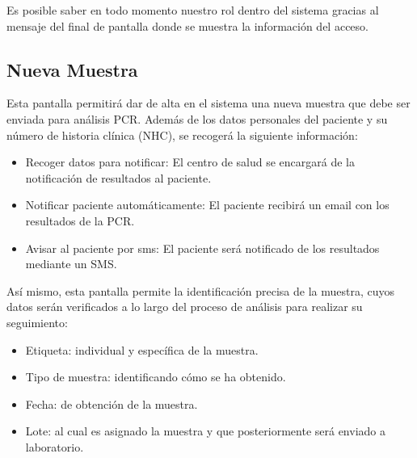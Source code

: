 \documentclass[a4paper,spanish]{paper}
\begin{document}
\medskip
\begin{tcolorbox}[colback=blue!3!white,colframe=blue(ryb)!50!black,title=\textbf{Tip}]

Es posible saber en todo momento nuestro rol dentro del sistema gracias al mensaje del final de pantalla donde se muestra la información del acceso.

\end{tcolorbox}

\subsection{Nueva Muestra}

Esta pantalla permitirá dar de alta en el sistema una nueva muestra que debe ser enviada para análisis PCR. Además de los datos personales del paciente y su número de historia clínica (NHC), se recogerá la siguiente información:

\begin{itemize}
    \item Recoger datos para notificar: El centro de salud se encargará de la notificación de resultados al paciente.
    \item Notificar paciente automáticamente: El paciente recibirá un email con los resultados de la PCR.
    \item Avisar al paciente por sms: El paciente será notificado de los resultados mediante un SMS.
    
\end{itemize}

Así mismo, esta pantalla permite la identificación precisa de la muestra, cuyos datos serán verificados a lo largo del proceso de análisis para realizar su seguimiento:

\begin{itemize}
    \item Etiqueta: individual y específica de la muestra.
    \item Tipo de muestra: identificando cómo se ha obtenido.
    \item Fecha: de obtención de la muestra.
    \item Lote: al cual es asignado la muestra y que posteriormente será enviado a laboratorio.
\end{itemize}
\end{document}
